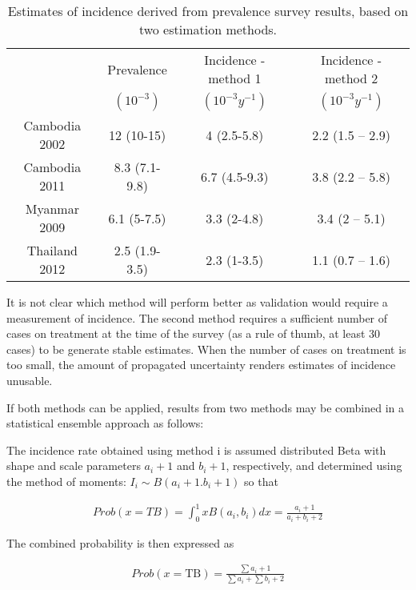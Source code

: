 \begin{table} 
\label{tab:2methods}
    \begin{tabular}{ c c c c }
    \hline
         & Prevalence & Incidence - method 1 & Incidence - method 2 \\ 
         & $(10^{-3})$  & $(10^{-3} y^{-1})$     & $(10^{-3} y^{-1})$ \\
    \hline
        Cambodia 2002 & 12 (10-15) & 4 (2.5-5.8) & 2.2 (1.5 – 2.9) \\ 
        Cambodia 2011 & 8.3 (7.1-9.8) & 6.7 (4.5-9.3) & 3.8 (2.2 – 5.8) \\ 
        Myanmar 2009 & 6.1 (5-7.5) & 3.3 (2-4.8) & 3.4 (2 – 5.1) \\ 
        Thailand 2012 & 2.5 (1.9-3.5) & 2.3 (1-3.5) & 1.1 (0.7 – 1.6) \\ 
    \hline
    \end{tabular} 
    \caption{Estimates of incidence derived from prevalence survey results, based on two estimation methods.} 
\end{table}

It is not clear which method will perform better as validation would require a measurement of incidence. The second method requires a sufficient number of cases on treatment at the time of the survey (as a rule of thumb, at least 30 cases) to be generate stable estimates. When the number of cases on treatment is too small, the amount of propagated uncertainty renders estimates of incidence unusable. 

If both methods can be applied, results from two methods may be combined in a statistical ensemble approach as follows:

The incidence rate obtained using method i is assumed distributed Beta with shape and scale parameters $a_i + 1$ and $b_i + 1$, respectively, and determined using the method of moments: $I_i \sim B(a_i + 1. b_i + 1)$ so that 

\begin{align*}
Prob(x=TB)= \int_{0}^{1} x B(a_i,b_i) dx = \frac{a_i+1}{a_i+b_i+2}
\end{align*}

The combined probability is then expressed as 

\begin{align*}
Prob(x = \textrm{TB}) = \frac{\sum{a_i}+1}{\sum{a_i}+\sum{b_i}+2} 
\end{align*}




